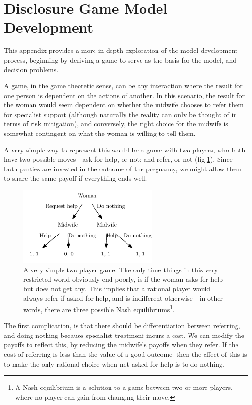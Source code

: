 \section{Disclosure Game Model Development}
\label{app:model_description}

This appendix provides a more in depth exploration of the model development process, beginning by deriving a game to serve as the basis for the model, and decision problems.

A game, in the game theoretic sense, can be any interaction where the result for one person is dependent on the actions of another. In this scenario, the result for the woman would seem dependent on whether the midwife chooses to refer them for specialist support (although naturally the reality can only be thought of in terms of risk mitigation), and conversely, the right choice for the midwife is somewhat contingent on what the woman is willing to tell them.

A very simple way to represent this would be a game with two players, who both have two possible moves - ask for help, or not; and refer, or not (fig \ref{fig:simplest_game}). Since both parties are invested in the outcome of the pregnancy, we might allow them to share the same payoff if everything ends well.


\begin{figure}[H]
\sidecaption
\includegraphics[width=7cm]{figures/simplest_game}
\caption{A very simple two player game. The only time things in this very restricted world obviously end poorly, is if the woman asks for help but does not get any. This implies that a rational player would always refer if asked for help, and is indifferent otherwise - in other words, there are three possible Nash equilibriums\footnote{A Nash equilibrium is a solution to a game between two or more players, where no player can gain from changing their move.}.}
\label{fig:simplest_game}
\end{figure}

The first complication, is that there should be differentiation between referring, and doing nothing because specialist treatment incurs a cost. We can modify the payoffs to reflect this, by reducing the midwife's payoffs when they refer. If the cost of referring is less than the value of a good outcome, then the effect of this is to make the only rational choice when not asked for help is to do nothing.

